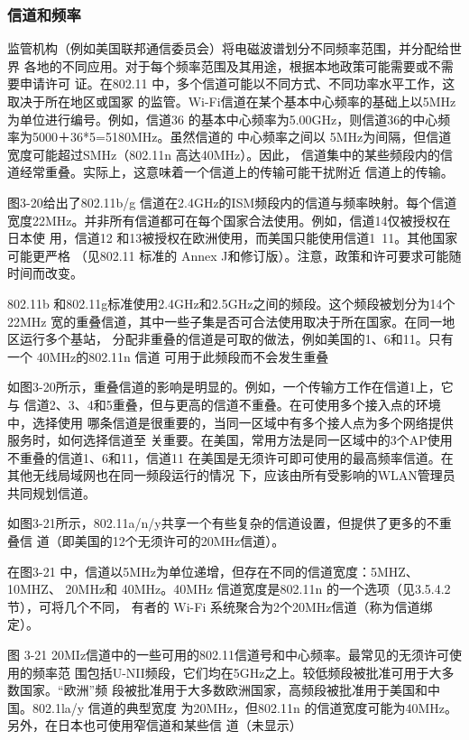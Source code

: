 \subsubsection{信道和频率}

监管机构（例如美国联邦通信委员会）将电磁波谱划分不同频率范围，并分配给世界
各地的不同应用。对于每个频率范围及其用途，根据本地政策可能需要或不需要申请许可
证。在802.11 中，多个信道可能以不同方式、不同功率水平工作，这取决于所在地区或国冢
的监管。Wi-Fi信道在某个基本中心频率的基础上以5MHz为单位进行编号。例如，信道36
的基本中心频率为5.00GHz，则信道36的中心频率为5000＋36*5=5180MHz。虽然信道的
中心频率之间以 5MHz为间隔，但信道宽度可能超过SMHz（802.11n 高达40MHz）。因此，
信道集中的某些频段内的信道经常重叠。实际上，这意味着一个信道上的传输可能干扰附近
信道上的传输。

图3-20给出了802.11b/g 信道在2.4GHz的ISM频段内的信道与频率映射。每个信道
宽度22MHz。并非所有信道都可在每个国家合法使用。例如，信道14仅被授权在日本使
用，信道12 和13被授权在欧洲使用，而美国只能使用信道1~11。其他国家可能更严格
（见802.11 标准的 Annex J和修订版）。注意，政策和许可要求可能随时间而改变。

802.11b 和802.11g标准使用2.4GHz和2.5GHz之间的频段。这个频段被划分为14个 22MHz
宽的重叠信道，其中一些子集是否可合法使用取决于所在国家。在同一地区运行多个基站，
分配非重叠的信道是可取的做法，例如美国的1、6和11。只有一个 40MHz的802.11n 信道
可用于此频段而不会发生重叠

如图3-20所示，重叠信道的影响是明显的。例如，一个传输方工作在信道1上，它与
信道2、3、4和5重叠，但与更高的信道不重叠。在可使用多个接入点的环境中，选择使用
哪条信道是很重要的，当同一区域中有多个接人点为多个网络提供服务时，如何选择信道至
关重要。在美国，常用方法是同一区域中的3个AP使用不重叠的信道1、6和11，信道11
在美国是无须许可即可使用的最高频率信道。在其他无线局域网也在同一频段运行的情况
下，应该由所有受影响的WLAN管理员共同规划信道。

如图3-21所示，802.11a/n/y共享一个有些复杂的信道设置，但提供了更多的不重叠信
道（即美国的12个无须许可的20MHz信道）。

在图3-21 中，信道以5MHz为单位递增，但存在不同的信道宽度：5MHZ、10MHZ、
20MHz和 40MHz。40MHz 信道宽度是802.11n 的一个选项（见3.5.4.2节），可将几个不同，
有者的 Wi-Fi 系统聚合为2个20MHz信道（称为信道绑定）。

图 3-21
20MIz信道中的一些可用的802.11信道号和中心频率。最常见的无须许可使用的频率范
围包括U-NII频段，它们均在5GHz之上。较低频段被批准可用于大多数国家。“欧洲”频
段被批准用于大多数欧洲国家，高频段被批准用于美国和中国。802.1la/y 信道的典型宽度
为20MHz，但802.11n 的信道宽度可能为40MHz。另外，在日本也可使用窄信道和某些信
道（未显示）

